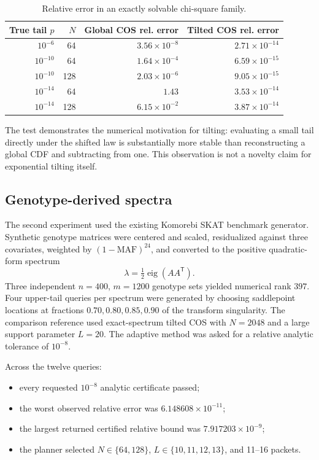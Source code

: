 \documentclass[11pt]{article}
\theoremstyle{definition}
\begin{document}
\begin{table}[htbp]
\centering
\caption{Relative error in an exactly solvable chi-square family.}
\label{tab:chi}
\begin{tabular}{rrrr}
\toprule
True tail $p$ & $N$ & Global COS rel. error & Tilted COS rel. error\\
\midrule
$10^{-6}$  & 64  & $3.56\times10^{-8}$ & $2.71\times10^{-14}$\\
$10^{-10}$ & 64  & $1.64\times10^{-4}$ & $6.59\times10^{-15}$\\
$10^{-10}$ & 128 & $2.03\times10^{-6}$ & $9.05\times10^{-15}$\\
$10^{-14}$ & 64  & $1.43$              & $3.53\times10^{-14}$\\
$10^{-14}$ & 128 & $6.15\times10^{-2}$ & $3.87\times10^{-14}$\\
\bottomrule
\end{tabular}
\end{table}

The test demonstrates the numerical motivation for tilting: evaluating a small tail directly under the shifted law is substantially more stable than reconstructing a global CDF and subtracting from one. This observation is not a novelty claim for exponential tilting itself.

\subsection{Genotype-derived spectra}

The second experiment used the existing Komorebi SKAT benchmark generator. Synthetic genotype matrices were centered and scaled, residualized against three covariates, weighted by $(1-\mathrm{MAF})^{24}$, and converted to the positive quadratic-form spectrum
\[
\lambda=\tfrac12\operatorname{eig}(AA^{\mathsf T}).
\]
Three independent $n=400$, $m=1200$ genotype sets yielded numerical rank $397$. Four upper-tail queries per spectrum were generated by choosing saddlepoint locations at fractions $0.70,0.80,0.85,0.90$ of the transform singularity. The comparison reference used exact-spectrum tilted COS with $N=2048$ and a large support parameter $L=20$. The adaptive method was asked for a relative analytic tolerance of $10^{-8}$.

Across the twelve queries:
\begin{itemize}
\item every requested $10^{-8}$ analytic certificate passed;
\item the worst observed relative error was $6.148608\times10^{-11}$;
\item the largest returned certified relative bound was $7.917203\times10^{-9}$;
\item the planner selected $N\in\{64,128\}$, $L\in\{10,11,12,13\}$, and 11--16 packets.
\end{itemize}
\end{document}
